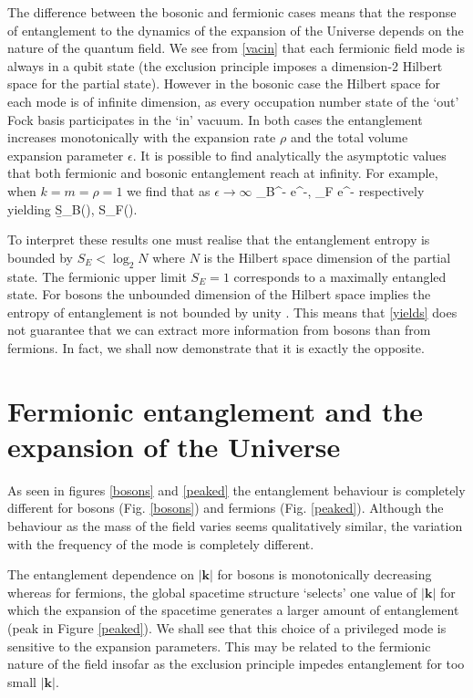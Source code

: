 The difference between the bosonic and fermionic cases means that the response of
entanglement  to the dynamics of the expansion of the Universe depends on the nature of the quantum field. We see from \eqref{vacin} that  each fermionic field mode is always in a qubit state (the exclusion principle imposes a dimension-2 Hilbert space for the partial state). However in the bosonic case \cite{caball} the Hilbert space for each mode is of infinite dimension, as every occupation number state of the `out' Fock basis participates in the `in' vacuum.
In both cases the entanglement increases monotonically with the expansion rate $\rho$ and the total volume expansion parameter $\epsilon$. It is possible to find analytically the asymptotic values that both fermionic and bosonic entanglement reach at infinity. For example, when $k=m=\rho=1$ we find that as $\epsilon\rightarrow\infty$
\b\label{yields}
\gamma_B^{-} \to e^{-\pi{}},  \qquad  \gamma_F \to e^{-\pi{}} 
\e
respectively yielding
\b
 S_{B}(\epsilon\rightarrow\infty), \qquad    S_{F}(\epsilon\rightarrow\infty).
 \e

 

To interpret these results one must realise that the entanglement entropy is bounded by $S_E < \log_2 N$ where $N$ is the Hilbert space dimension of the partial state. The  fermionic upper limit $S_E=1$ corresponds to a maximally entangled state. For bosons the unbounded dimension of the Hilbert space implies the entropy of entanglement is not bounded by  unity  \cite{caball}. This means that \eqref{yields} does not guarantee that we can extract more information from bosons than from fermions. In fact, we shall now demonstrate that it is exactly the opposite.



\section{Fermionic entanglement and the expansion of the Universe}\label{sec4}

As seen in figures \ref{bosons} and \ref{peaked} the entanglement behaviour is completely different for bosons (Fig. \ref{bosons}) and fermions (Fig. \ref{peaked}). Although the behaviour as the mass of the field varies seems qualitatively similar, the variation with the frequency of the mode is completely different. 

The entanglement dependence on $|\bm k|$ for bosons is monotonically decreasing whereas for fermions, the global spacetime structure `selects' one value of $|\bm k|$ for which the expansion of the spacetime generates a larger amount of entanglement (peak in Figure \ref{peaked}). We shall see that this choice of a privileged mode is sensitive to the expansion parameters. This may be related to the fermionic nature of the field insofar as the exclusion principle impedes entanglement for too small $|\bm k|$.

